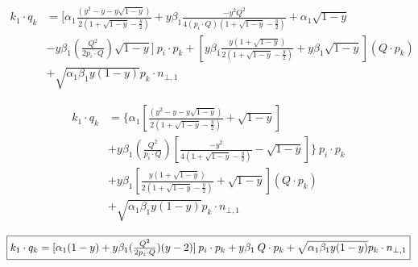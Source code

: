 \begin{equation}
	\begin{aligned}
	k_1 \cdot q_k &= [\alpha_1 \frac{(y^2 -y-y\sqrt{1-y}) }{2(1+\sqrt{1-y}-\frac{y}{2})}+y\beta_1\frac{-y^2 Q^2 }{4(p_i\cdot Q)(1+\sqrt{1-y}-\frac{y}{2})}+\alpha_1 \sqrt{1-y}\\&-y\beta_1(\frac{Q^2}{2p_i \cdot Q})\sqrt{1-y}]\:p_i \cdot p_k+[y\beta_1\frac{y(1+\sqrt{1-y})}{2(1+\sqrt{1-y}-\frac{y}{2})}+y\beta_1\sqrt{1-y}](Q\cdot p_k)\\
	&+\sqrt{\alpha_1\beta_1y(1-y)} p_k \cdot {n_{\bot,1}} 
    \end{aligned}
\end{equation}

\begin{equation}
	\begin{aligned}
	k_1 \cdot q_k &= \lbrace\alpha_1 [\frac{(y^2 -y-y\sqrt{1-y}) }{2(1+\sqrt{1-y}-\frac{y}{2})}+ \sqrt{1-y}]\\
	&+y\beta_1(\frac{Q^2}{p_i \cdot Q})[\frac{-y^2 }{4(1+\sqrt{1-y}-\frac{y}{2})}-\sqrt{1-y}]\rbrace\:p_i \cdot p_k\\
	&+y\beta_1[\frac{y(1+\sqrt{1-y})}{2(1+\sqrt{1-y}-\frac{y}{2})}+\sqrt{1-y}](Q\cdot p_k)\\
	&+\sqrt{\alpha_1\beta_1y(1-y)} p_k \cdot {n_{\bot,1}} 
    \end{aligned}
\end{equation}

\begin{equation}
	\begin{aligned}
		\fbox{$  k_1 \cdot q_k = [\alpha_1 (1-y)+y\beta_1(\frac{Q^2}{2p_i \cdot Q})(y-2)]\:p_i \cdot p_k+y\beta_1\:Q\cdot p_k+\sqrt{\alpha_1\beta_1y(1-y)} p_k \cdot {n_{\bot,1}} $}
    \end{aligned}
\end{equation}
\newpage